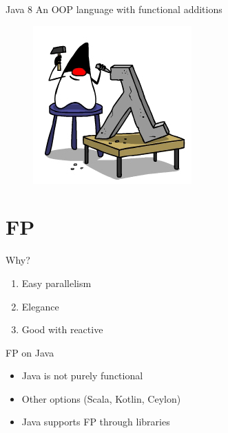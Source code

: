 \documentclass[14pt]{beamer}
\begin{document}
\begin{frame}{Java 8}
    An OOP language with functional additions
			\begin{figure}
			\centering
			\includegraphics[width=0.5\linewidth]{Images/JavaLam-1}
			\end{figure}
\end{frame}

\section{FP}
\begin{frame}{Why?}
	\begin{enumerate}
	\item Easy parallelism 
	\item Elegance
	\item Good with reactive
	\end{enumerate}
\end{frame}

\begin{frame}{FP on Java}
	\begin{itemize}
	\item Java is not purely functional
	\item Other options (Scala, Kotlin, Ceylon)
	\item Java supports \alert{FP through libraries}
	\end{itemize}
\end{frame}
\end{document}
